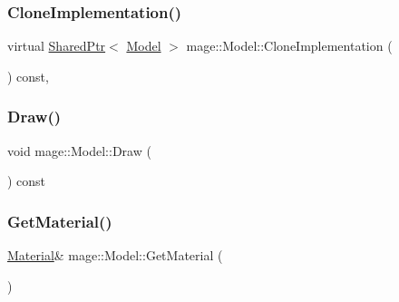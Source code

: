 \hypertarget{classmage_1_1_model_af90feb622e30e1531983c01372b2df37}{}\label{classmage_1_1_model_af90feb622e30e1531983c01372b2df37} 
\subsubsection{\texorpdfstring{Clone\+Implementation()}{CloneImplementation()}}
{\footnotesize\ttfamily virtual \hyperlink{namespacemage_a1e01ae66713838a7a67d30e44c67703e}{Shared\+Ptr}$<$ \hyperlink{classmage_1_1_model}{Model} $>$ mage\+::\+Model\+::\+Clone\+Implementation (\begin{DoxyParamCaption}{ }\end{DoxyParamCaption}) const\hspace{0.3cm}{\ttfamily [private]}, {\ttfamily [virtual]}}

\hypertarget{classmage_1_1_model_a13badcd5e7bfaf8fbdc447dc211d5ad9}{}\label{classmage_1_1_model_a13badcd5e7bfaf8fbdc447dc211d5ad9} 
\subsubsection{\texorpdfstring{Draw()}{Draw()}}
{\footnotesize\ttfamily void mage\+::\+Model\+::\+Draw (\begin{DoxyParamCaption}{ }\end{DoxyParamCaption}) const}

\hypertarget{classmage_1_1_model_ae2d9b0fee188fe8f0377872bc2f8c2f6}{}\label{classmage_1_1_model_ae2d9b0fee188fe8f0377872bc2f8c2f6} 
\subsubsection{\texorpdfstring{Get\+Material()}{GetMaterial()}\hspace{0.1cm}{\footnotesize\ttfamily [1/2]}}
{\footnotesize\ttfamily \hyperlink{structmage_1_1_material}{Material}\& mage\+::\+Model\+::\+Get\+Material (\begin{DoxyParamCaption}{ }\end{DoxyParamCaption})}

\hypertarget{classmage_1_1_model_aedb16dfea55edaefc3e5d88e9f9fa756}{}\label{classmage_1_1_model_aedb16dfea55edaefc3e5d88e9f9fa756} 
